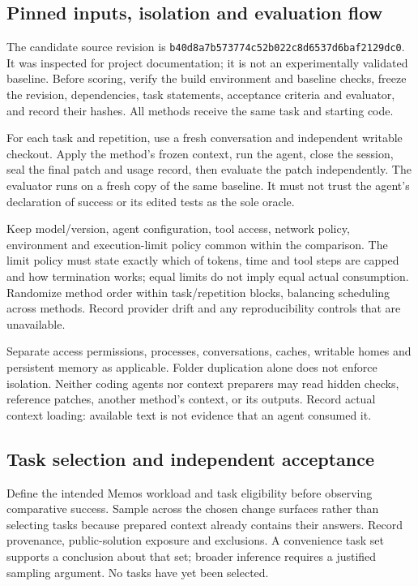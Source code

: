 \subsection{Pinned inputs, isolation and evaluation flow}
The candidate source revision is
\nolinkurl{b40d8a7b573774c52b022c8d6537d6baf2129dc0}. It was inspected for
project documentation; it is not an experimentally validated baseline.
Before scoring, verify the build environment and baseline checks, freeze the
revision, dependencies, task statements, acceptance criteria and evaluator,
and record their hashes. All methods receive the same task and starting code.

For each task and repetition, use a fresh conversation and independent writable
checkout. Apply the method's frozen context, run the agent, close the session,
seal the final patch and usage record, then evaluate the patch independently.
The evaluator runs on a fresh copy of the same baseline. It must not trust the
agent's declaration of success or its edited tests as the sole oracle.

Keep model/version, agent configuration, tool access, network policy, environment
and execution-limit policy common within the comparison. The limit policy must
state exactly which of tokens, time and tool steps are capped and how termination
works; equal limits do not imply equal actual consumption. Randomize method
order within task/repetition blocks, balancing scheduling across methods.
Record provider drift and any reproducibility controls that are unavailable.

Separate access permissions, processes, conversations, caches, writable homes
and persistent memory as applicable. Folder duplication alone does not enforce
isolation. Neither coding agents nor context preparers may read hidden checks,
reference patches, another method's context, or its outputs. Record actual
context loading: available text is not evidence that an agent consumed it.

\subsection{Task selection and independent acceptance}
Define the intended Memos workload and task eligibility before observing
comparative success. Sample across the chosen change surfaces rather than
selecting tasks because prepared context already contains their answers.
Record provenance, public-solution exposure and exclusions. A convenience task
set supports a conclusion about that set; broader inference requires a justified
sampling argument. No tasks have yet been selected.

